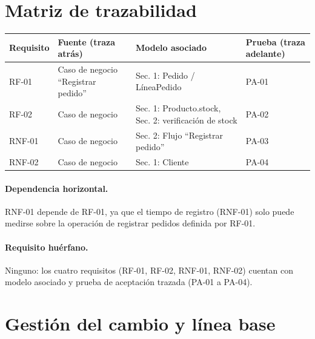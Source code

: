 \documentclass[11pt,a4paper]{article}
\begin{document}
\section{Matriz de trazabilidad}

\begin{center}
\begin{tabular}{@{}llll@{}}
\toprule
\textbf{Requisito} & \textbf{Fuente (traza atrás)} & \textbf{Modelo asociado} & \textbf{Prueba (traza adelante)} \\
\midrule
RF-01  & Caso de negocio ``Registrar pedido'' & Sec. 1: Pedido / LíneaPedido            & PA-01 \\
RF-02  & Caso de negocio                       & Sec. 1: Producto.stock, Sec. 2: verificación de stock & PA-02 \\
RNF-01 & Caso de negocio                       & Sec. 2: Flujo ``Registrar pedido'' & PA-03 \\
RNF-02 & Caso de negocio                       & Sec. 1: Cliente & PA-04 \\
\bottomrule
\end{tabular}
\end{center}

\paragraph{Dependencia horizontal.} RNF-01 depende de RF-01, ya que el
tiempo de registro (RNF-01) solo puede medirse sobre la operación de
registrar pedidos definida por RF-01.

\paragraph{Requisito huérfano.} Ninguno: los cuatro requisitos (RF-01, RF-02,
RNF-01, RNF-02) cuentan con modelo asociado y prueba de aceptación
trazada (PA-01 a PA-04).

\section{Gestión del cambio y línea base}
\end{document}
